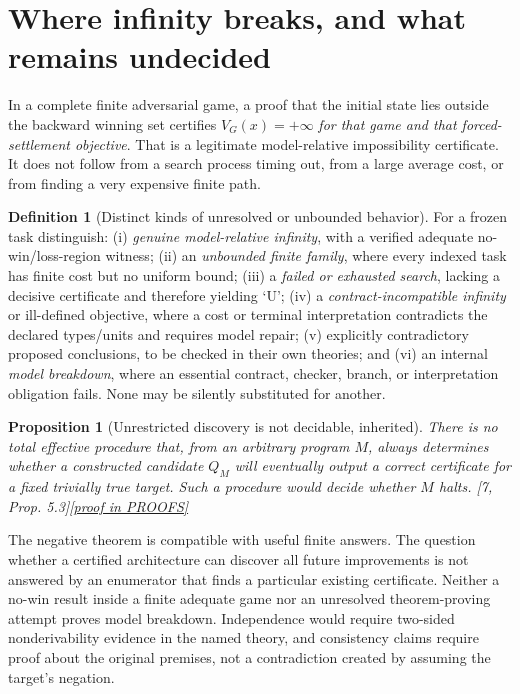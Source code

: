 \documentclass[11pt,letterpaper]{article}
\newtheorem{proposition}[theorem]{Proposition}
\theoremstyle{definition}
\newtheorem{definition}[theorem]{Definition}
\theoremstyle{remark}
\newcommand{\prooflink}[1]{\hfill\hyperlink{proof:#1}{\footnotesize[proof in PROOFS]}}
\newcommand{\src}[1]{\textup{[#1]}}
\begin{document}
\section{Where infinity breaks, and what remains undecided}
In a complete finite adversarial game, a proof that the initial state lies outside the backward winning set certifies $V_G(x)=+\infty$ \emph{for that game and that forced-settlement objective}. That is a legitimate model-relative impossibility certificate. It does not follow from a search process timing out, from a large average cost, or from finding a very expensive finite path.

\begin{definition}[Distinct kinds of unresolved or unbounded behavior]\label{def:infinity}
For a frozen task distinguish: (i) \emph{genuine model-relative infinity}, with a verified adequate no-win/loss-region witness; (ii) an \emph{unbounded finite family}, where every indexed task has finite cost but no uniform bound; (iii) a \emph{failed or exhausted search}, lacking a decisive certificate and therefore yielding `U'; (iv) a \emph{contract-incompatible infinity} or ill-defined objective, where a cost or terminal interpretation contradicts the declared types/units and requires model repair; (v) explicitly contradictory proposed conclusions, to be checked in their own theories; and (vi) an internal \emph{model breakdown}, where an essential contract, checker, branch, or interpretation obligation fails. None may be silently substituted for another.
\end{definition}

\begin{proposition}[Unrestricted discovery is not decidable, inherited]\label{prop:undecidable}\hypertarget{claim:undecidable}{}
There is no total effective procedure that, from an arbitrary program $M$, always determines whether a constructed candidate $Q_M$ will eventually output a correct certificate for a fixed trivially true target. Such a procedure would decide whether $M$ halts. \src{7, Prop. 5.3}\prooflink{undecidable}
\end{proposition}

The negative theorem is compatible with useful finite answers. The question whether a certified architecture can discover all future improvements is not answered by an enumerator that finds a particular existing certificate. Neither a no-win result inside a finite adequate game nor an unresolved theorem-proving attempt proves model breakdown. Independence would require two-sided nonderivability evidence in the named theory, and consistency claims require proof about the original premises, not a contradiction created by assuming the target's negation.
\end{document}
